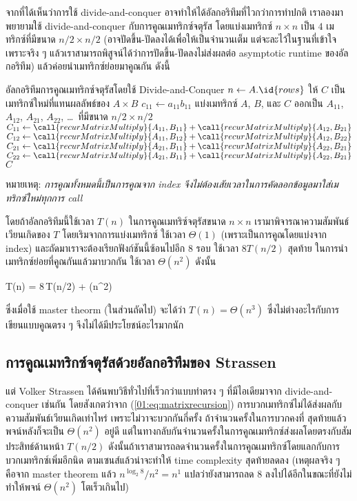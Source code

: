 จากที่ได้เห็นว่าการใช้ divide-and-conquer อาจทำให้ได้อัลกอริทึมที่ไวกว่าการทำปกติ เราลองมาพยายามใช้ divide-and-conquer กับการคูณเมทริกซ์จตุรัส โดยแบ่งเมทริกซ์ $n\times n$ เป็น $4$ เมทริกซ์ที่มีขนาด $n/2\times n/2$ (อาจปัดขึ้น-ปัดลงได้เพื่อให้เป็นจำนวนเต็ม แต่จะละไว้ในฐานที่เข้าใจเพราะจริง ๆ แล้วเราสามารถพิสูจน์ได้ว่าการปัดขึ้น-ปัดลงไม่ส่งผลต่อ asymptotic runtime ของอัลกอริทึม) แล้วค่อยนำเมทริกซ์ย่อยมาคูณกัน ดังนี้
\begin{codebox}{อัลกอริทึมการคูณเมทริกซ์จตุรัสโดยใช้ Divide-and-Conquer}
		\State $n \gets A.\id{rows}$
		\State ให้ $C$ เป็นเมทริกซ์ใหม่ที่แทนผลลัพธ์ของ $A\times B$
			\State $c_{11} \gets a_{11}b_{11}$ 
		\Else
			\State แบ่งเมทริกซ์ $A$, $B$, และ $C$ ออกเป็น $A_{11}$, $A_{12}$, $A_{21}$, $A_{22}$, \dots\ ที่มีขนาด $n/2 \times n/2$
			\State $C_{11} \gets \call{recurMatrixMultiply}{A_{11}, B_{11}} + \call{recurMatrixMultiply}{A_{12}, B_{21}}$
			\State $C_{12} \gets \call{recurMatrixMultiply}{A_{11}, B_{12}} + \call{recurMatrixMultiply}{A_{12}, B_{22}}$
			\State $C_{21} \gets \call{recurMatrixMultiply}{A_{21}, B_{11}} + \call{recurMatrixMultiply}{A_{22}, B_{21}}$
			\State $C_{22} \gets \call{recurMatrixMultiply}{A_{21}, B_{11}} + \call{recurMatrixMultiply}{A_{22}, B_{21}}$
		\EndIf
		\State \Return $C$
	\EndFunction
\end{codebox}
หมายเหตุ: \emph{การคูณทั้งหมดนี้เป็นการคูณจาก index จึงไม่ต้องเสัยเวลาในการคัดลอกข้อมูลมาใส่เมทริกซ์ใหม่ทุกการ call}

โดยถ้าอัลกอริทึมนี้ใช้เวลา $T(n)$ ในการคูณเมทริซ์จตุรัสขนาด $n\times n$ เรามาพิจารณาความสัมพันธ์เวียนเกิดของ $T$ โดยเริมจากการแบ่งเมทริกซ์ ใช้เวลา $\Theta(1)$ (เพราะเป็นการคูณโดยแบ่งจาก index) และถัดมาเราจะต้องเรียกฟังก์ชันนี้ซ้อนไปอีก $8$ รอบ ใช้เวลา $8T(n/2)$ สุดท้าย ในการนำเมทริกซ์ย่อยที่คูณกันแล้วมาบวกกัน ใช้เวลา $\Theta(n^2)$ ดังนั้น
\begin{eqnobox}[label=01:eq:matrixrecursion]
	T(n) = 8\,T(n/2) + \Theta(n^2)
\end{eqnobox}
ซึ่งเมื่อใช้ master theorm (ในส่วนถัดไป) จะได้ว่า $T(n) = \Theta(n^3)$ ซึ่งไม่ต่างอะไรกับการเขียนแบบคูณตรง ๆ จึงไม่ได้มีประโยชน์อะไรมากนัก

\subsection{การคูณเมทริกซ์จตุรัสด้วยอัลกอริทึมของ Strassen}

แต่ Volker Strassen ได้ค้นพบวิธีทั่วไปที่เร็วกว่าแบบทำตรง ๆ ที่มีไอเดียมาจาก divide-and-conquer เช่นกัน โดยสังเกตว่าจาก (\ref{01:eq:matrixrecursion}) การบวกเมทริกซ์ไม่ได้ส่งผลกับความสัมพันธ์เวียนเกิดเท่าไหร่ เพราะไม่วาจะบวกกันกี่ครั้ง ถ้าจำนวนครั้งในการบวกคงที่ สุดท้ายแล้วพจน์หลังก็จะเป็น $\Theta(n^2)$ อยู่ดี แต่ในทางกลับกันจำนวนครั้งในการคูณเมทริกซ์ส่งผลโดยตรงกับสัมประสิทธ์ด้านหน้า $T(n/2)$ ดังนั้นถ้าเราสามารถลดจำนวนครั้งในการคูณเมทริกซ์โดยแลกกับการบวกเมทริกซ์เพิ่มอีกนิด ตามเซนส์แล้วน่าจะทำให้ time complexity สุดท้ายลดลง (เหตุผลจริง ๆ คือจาก master theorem แล้ว $n^{\log_2 8}/n^2 = n^1$ แปลว่ายังสามารถลด $8$ ลงไปได้อีกในขณะที่ยังไม่ทำให้พจน์ $\Theta(n^2)$ โตเร็วเกินไป)

